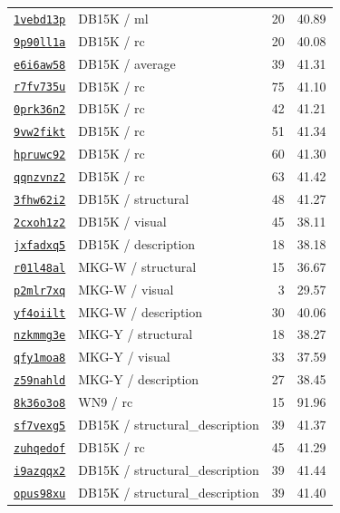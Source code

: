 \begin{longtable}{@{}llrr@{}}
\href{\dsomrunbase 1vebd13p}{\texttt{1vebd13p}} & DB15K / ml & 20 & 40.89 \\
\href{\dsomrunbase 9p90ll1a}{\texttt{9p90ll1a}} & DB15K / rc & 20 & 40.08 \\
\href{\dsomrunbase e6i6aw58}{\texttt{e6i6aw58}} & DB15K / average & 39 & 41.31 \\
\href{\dsomrunbase r7fv735u}{\texttt{r7fv735u}} & DB15K / rc & 75 & 41.10 \\
\href{\dsomrunbase 0prk36n2}{\texttt{0prk36n2}} & DB15K / rc & 42 & 41.21 \\
\href{\dsomrunbase 9vw2fikt}{\texttt{9vw2fikt}} & DB15K / rc & 51 & 41.34 \\
\href{\dsomrunbase hpruwc92}{\texttt{hpruwc92}} & DB15K / rc & 60 & 41.30 \\
\href{\dsomrunbase qqnzvnz2}{\texttt{qqnzvnz2}} & DB15K / rc & 63 & 41.42 \\
\href{\dsomrunbase 3fhw62i2}{\texttt{3fhw62i2}} & DB15K / structural & 48 & 41.27 \\
\href{\dsomrunbase 2cxoh1z2}{\texttt{2cxoh1z2}} & DB15K / visual & 45 & 38.11 \\
\href{\dsomrunbase jxfadxq5}{\texttt{jxfadxq5}} & DB15K / description & 18 & 38.18 \\
\href{\dsomrunbase r01l48al}{\texttt{r01l48al}} & MKG-W / structural & 15 & 36.67 \\
\href{\dsomrunbase p2mlr7xq}{\texttt{p2mlr7xq}} & MKG-W / visual & 3 & 29.57 \\
\href{\dsomrunbase yf4oiilt}{\texttt{yf4oiilt}} & MKG-W / description & 30 & 40.06 \\
\href{\dsomrunbase nzkmmg3e}{\texttt{nzkmmg3e}} & MKG-Y / structural & 18 & 38.27 \\
\href{\dsomrunbase qfy1moa8}{\texttt{qfy1moa8}} & MKG-Y / visual & 33 & 37.59 \\
\href{\dsomrunbase z59nahld}{\texttt{z59nahld}} & MKG-Y / description & 27 & 38.45 \\
\href{\dsomrunbase 8k36o3o8}{\texttt{8k36o3o8}} & WN9 / rc & 15 & 91.96 \\
\href{\dsomrunbase sf7vexg5}{\texttt{sf7vexg5}} & DB15K / structural\_description & 39 & 41.37 \\
\href{\dsomrunbase zuhqedof}{\texttt{zuhqedof}} & DB15K / rc & 45 & 41.29 \\
\href{\dsomrunbase i9azqqx2}{\texttt{i9azqqx2}} & DB15K / structural\_description & 39 & 41.44 \\
\href{\dsomrunbase opus98xu}{\texttt{opus98xu}} & DB15K / structural\_description & 39 & 41.40 \\
\bottomrule
\end{longtable}
